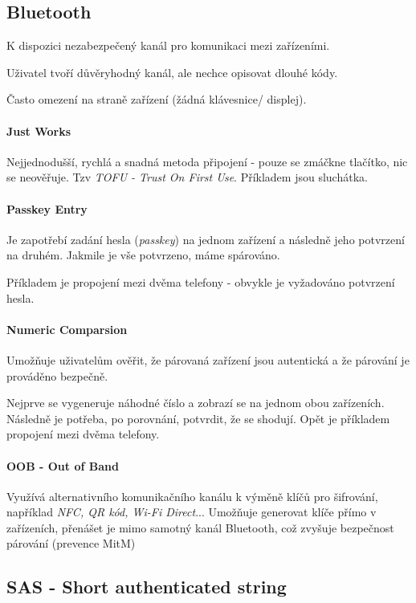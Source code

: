 \documentclass[10pt,a4paper]{article}
\begin{document}
\subsection{Bluetooth}
K dispozici nezabezpečený kanál pro komunikaci mezi zařízeními.

Uživatel tvoří důvěryhodný kanál, ale nechce opisovat dlouhé kódy.

Často omezení na straně zařízení (žádná klávesnice/ displej).

\paragraph{Just Works}

Nejjednodušší, rychlá a snadná metoda připojení - pouze se zmáčkne tlačítko, nic se neověřuje. Tzv \textit{TOFU - Trust On First Use}.
Příkladem jsou sluchátka.


\paragraph{Passkey Entry}
Je zapotřebí zadání hesla (\textit{passkey}) na jednom zařízení a následně jeho potvrzení na druhém.
Jakmile je vše potvrzeno, máme spárováno.

Příkladem je propojení mezi dvěma telefony - obvykle je vyžadováno potvrzení hesla.

\paragraph{Numeric Comparsion}
Umožňuje uživatelům ověřit, že párovaná zařízení jsou autentická a že párování je prováděno bezpečně. 

Nejprve se vygeneruje náhodné číslo a zobrazí se na jednom obou zařízeních. Následně je potřeba, po porovnání, potvrdit, že se shodují.
Opět je příkladem propojení mezi dvěma telefony.



\paragraph{OOB - Out of Band}

Využívá alternativního komunikačního kanálu k výměně klíčů pro šifrování, například \textit{NFC, QR kód, Wi-Fi Direct}...
Umožňuje generovat klíče přímo v zařízeních, přenášet je mimo samotný kanál Bluetooth, což zvyšuje bezpečnost párování (prevence MitM)


\subsection{SAS - Short authenticated string }
\end{document}
